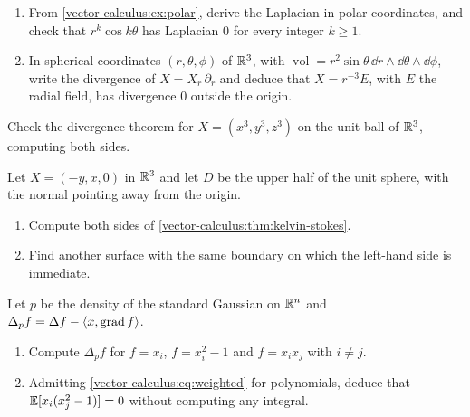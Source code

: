 \begin{notechapter}
\begin{exercise}\label{vector-calculus:exr:2}
\begin{enumerate}[nosep]
  \item From \cref{vector-calculus:ex:polar}, derive the Laplacian in
        polar coordinates, and check that $r^k\cos k\theta$ has
        Laplacian $0$ for every integer $k\geq1$.
  \item In spherical coordinates
        $(r, \theta, \phi)$ of $\mathbb{R}^3$, with
        $\operatorname{vol} = r^2\sin\theta\,
        \dd r\wedge\dd\theta\wedge\dd\phi$, write the divergence of
        $X = X_r\,\partial_r$ and deduce that $X = r^{-3}E$, with $E$
        the radial field, has divergence $0$ outside the origin.
\end{enumerate}
\end{exercise}

\begin{exercise}\label{vector-calculus:exr:3}
Check the divergence theorem for $X = (x^3, y^3, z^3)$ on the unit
ball of $\mathbb{R}^3$, computing both sides.
\end{exercise}

\begin{exercise}\label{vector-calculus:exr:4}
Let $X = (-y, x, 0)$ in $\mathbb{R}^3$ and let $D$ be the upper half of the
unit sphere, with the normal pointing away from the origin.
\begin{enumerate}[nosep]
  \item Compute both sides of
        \cref{vector-calculus:thm:kelvin-stokes}.
  \item Find another surface with the same boundary on which the
        left-hand side is immediate.
\end{enumerate}
\end{exercise}

\begin{exercise}\label{vector-calculus:exr:5}
Let $p$ be the density of the standard Gaussian on $\mathbb{R}^n$ and
$\Delta_pf = \Delta f - \left\langle x, \operatorname{grad}f \right\rangle$.
\begin{enumerate}[nosep]
  \item Compute $\Delta_pf$ for $f = x_i$, $f = x_i^2 - 1$ and
        $f = x_ix_j$ with $i\neq j$.
  \item Admitting \eqref{vector-calculus:eq:weighted} for polynomials,
        deduce that $\mathbb{E}[x_i(x_j^2 - 1)] = 0$ without computing any
        integral.
\end{enumerate}
\end{exercise}


\end{notechapter}
